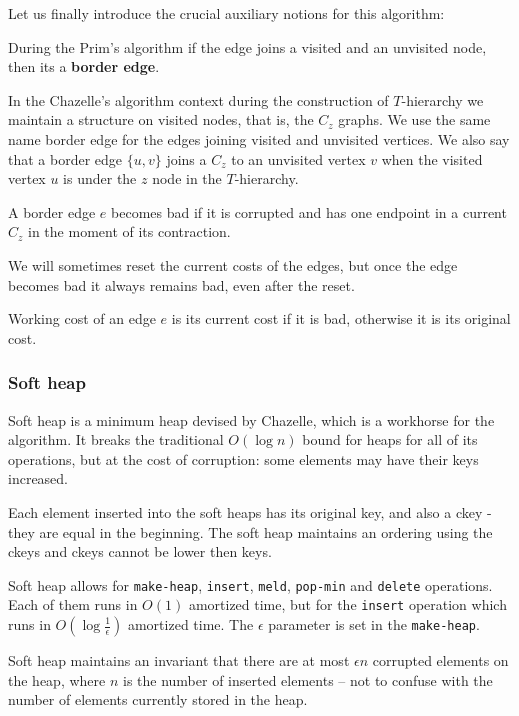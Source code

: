 Let us finally introduce the crucial auxiliary notions for this algorithm:
\begin{definition}
    During the Prim's algorithm if the edge joins a visited and an unvisited node, then its a \textbf{border edge}.
\end{definition}

In the Chazelle's algorithm context during the construction of $T$-hierarchy we maintain a structure on visited nodes, that is, the $C_z$ graphs. We use the same name border edge for the edges joining visited and unvisited vertices. We also say that a border edge $\{u, v\}$ joins a $C_z$ to an unvisited vertex $v$ when the visited vertex $u$ is under the $z$ node in the $T$-hierarchy.

\begin{definition}
    A border edge $e$ becomes bad if it is corrupted and has one endpoint in a current $C_z$ in the moment of its contraction.
\end{definition}
    We will sometimes reset the current costs of the edges, but once the edge becomes bad it always remains bad, even after the reset.


\begin{definition}
    Working cost of an edge $e$ is its current cost if it is bad, otherwise it is its original cost.
\end{definition}

\subsubsection{Soft heap}
Soft heap is a minimum heap devised by Chazelle, which is a workhorse for the algorithm. It breaks the traditional $O(\log{n})$ bound for heaps for all of its operations, but at the cost of corruption: some elements may have their keys increased. 

Each element inserted into the soft heaps has its original key, and also a ckey - they are equal in the beginning. The soft heap maintains an ordering using the ckeys and ckeys cannot be lower then keys. 

Soft heap allows for \texttt{make-heap}, \texttt{insert}, \texttt{meld}, \texttt{pop-min} and \texttt{delete} operations. Each of them runs in $O(1)$ amortized time, but for the \texttt{insert} operation which runs in $O(\log{\frac{1}{\epsilon}})$ amortized time. The $\epsilon$ parameter is set in the \texttt{make-heap}. 

Soft heap maintains an invariant that there are at most $\epsilon n$ corrupted elements on the heap, where $n$ is the number of inserted elements -- not to confuse with the number of elements currently stored in the heap.

